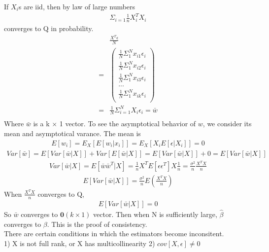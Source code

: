 \documentclass[a4paper]{article}
\begin{document}
If $X_i$s are iid, then by law of large numbers
\begin{align*}
\Sigma_{i=1}  \frac{1}{n}{X_i^TX_i} 
\end{align*}
converges to Q in probability.\\
\begin{align*}
&\frac{X^T \epsilon}{N}\\ 
 =& \left(\begin{array} {c}
       \frac{1}{N}\Sigma_{1}^{N}x_{i1}\epsilon_i \\
       \frac{1}{N}\Sigma_{1}^{N}x_{i2}\epsilon_i \\
       \frac{1}{N}\Sigma_{1}^{N}x_{i3}\epsilon_i \\
       ... \\ 
      \frac{1}{N}\Sigma_{1}^{N}x_{ik}\epsilon_i\\
     \end{array} \right)\\
=& \frac{1}{N}\Sigma_{i=1}^{N} X_i\epsilon_i = \bar w\\
\end{align*}
Where $\bar w$ is a k $\times$ 1 vector. To see the asymptotical behavior of $w$, we consider its mean and asymptotical varance. The mean is
\begin{align*}
E[w_i]=E_X[E[w_i|x_i]] = E_X[X_iE[\epsilon|X_i]] = 0
\end{align*}
\begin{align*}
Var[\bar w]=E[Var[\bar w|X]]+Var[E[\bar w|X]] = E[Var[\bar w|X]]+0 = E[Var[\bar w|X]]
\end{align*}
\begin{align*}
Var[\bar w|X] = E[\bar w \bar w^T|X]=\frac{1}{n}X^TE[\epsilon \epsilon^T]X\frac{1}{n} = \frac{\sigma^2}{n}\frac{X^T X}{n}
\end{align*}
\begin{align*}
E[Var[\bar w|X]] = \frac{\sigma^2}{n}E(\frac{X^TX}{n})
\end{align*}
When $\frac{X^TX}{n}$ converges to Q, 
\begin{align*}
E[Var[\bar w|X]] = 0
\end{align*} 
So $\bar w$ converges to $\boldsymbol 0(k \times 1)$ vector. Then when N is sufficiently large, $\hat \beta$ converges to $\beta$. This is the proof of consistency.\\
There are certain conditions in which the estimators become inconsitent.\\
1) X is not full rank, or X has multicollinearity
2) $cov[X, \epsilon] \neq 0$
\end{document}
